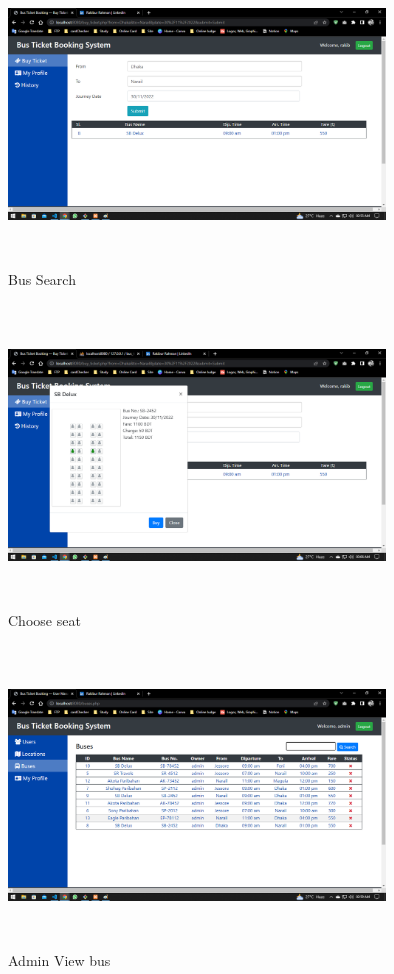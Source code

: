 \documentclass[runningheads]{llncs}
\begin{document}
\begin{figure}[h]
    \centering
    \includegraphics[width=10cm,height=8cm]{img/bussearch.png}
    \caption{Bus Search}
    \label{fig:my_label}
\end{figure}
\begin{figure}[h]
    \centering
    \includegraphics[width=10cm,height=8cm]{img/purchase ticket.png}
    \caption{Choose seat}
    \label{fig:my_label}
\end{figure}
\newpage
\begin{figure}[h]
    \centering
    \includegraphics[width=10cm,height=8cm]{img/admin view bus.png}
    \caption{Admin View bus}
    \label{fig:my_label}
\end{figure}
\end{document}
